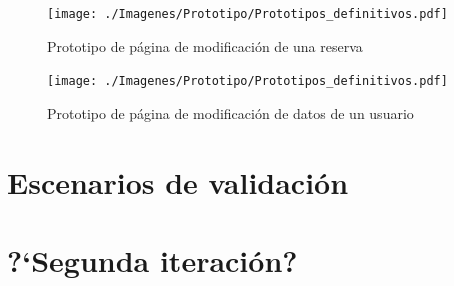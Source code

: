 \begin{figure}[H]
    \centering
    \texttt{[image: ./Imagenes/Prototipo/Prototipos\_definitivos.pdf]}
    \label{fig:prot_reservas_mod}
    \caption{Prototipo de página de modificación de una reserva}
\end{figure}

\begin{figure}[H]
    \centering
    \texttt{[image: ./Imagenes/Prototipo/Prototipos\_definitivos.pdf]}
    \label{fig:prot_usuario_mod}
    \caption{Prototipo de página de modificación de datos de un usuario}
\end{figure}




\section{Escenarios de validación}

\section{?`Segunda iteración?}
